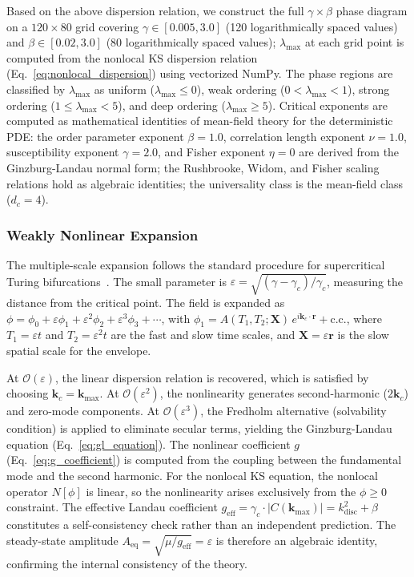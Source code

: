 \documentclass[sn-nature,pdflatex]{sn-jnl}
\begin{document}
Based on the above dispersion relation, we construct the full $\gamma\times\beta$ phase diagram on a $120 \times 80$ grid covering $\gamma \in [0.005, 3.0]$ (120 logarithmically spaced values) and $\beta \in [0.02, 3.0]$ (80 logarithmically spaced values); $\lambda_{\max}$ at each grid point is computed from the nonlocal KS dispersion relation (Eq.~\ref{eq:nonlocal_dispersion}) using vectorized NumPy. The phase regions are classified by $\lambda_{\max}$ as uniform ($\lambda_{\max} \le 0$), weak ordering ($0 < \lambda_{\max} < 1$), strong ordering ($1 \le \lambda_{\max} < 5$), and deep ordering ($\lambda_{\max} \ge 5$). Critical exponents are computed as mathematical identities of mean-field theory for the deterministic PDE: the order parameter exponent $\beta = 1.0$, correlation length exponent $\nu = 1.0$, susceptibility exponent $\gamma = 2.0$, and Fisher exponent $\eta = 0$ are derived from the Ginzburg-Landau normal form; the Rushbrooke, Widom, and Fisher scaling relations hold as algebraic identities; the universality class is the mean-field class ($d_c = 4$).

\subsubsection{Weakly Nonlinear Expansion}

The multiple-scale expansion follows the standard procedure for supercritical Turing bifurcations~\cite{aranson_kramer_2002}. The small parameter is $\varepsilon = \sqrt{(\gamma - \gamma_c)/\gamma_c}$, measuring the distance from the critical point. The field is expanded as $\phi = \phi_0 + \varepsilon\phi_1 + \varepsilon^2\phi_2 + \varepsilon^3\phi_3 + \cdots$, with $\phi_1 = A(T_1, T_2; \mathbf{X})\,e^{i\mathbf{k}_c\cdot\mathbf{r}} + \text{c.c.}$, where $T_1 = \varepsilon t$ and $T_2 = \varepsilon^2 t$ are the fast and slow time scales, and $\mathbf{X} = \varepsilon\mathbf{r}$ is the slow spatial scale for the envelope.

At $\mathcal{O}(\varepsilon)$, the linear dispersion relation is recovered, which is satisfied by choosing $\mathbf{k}_c = \mathbf{k}_{\max}$. At $\mathcal{O}(\varepsilon^2)$, the nonlinearity generates second-harmonic ($2\mathbf{k}_c$) and zero-mode components. At $\mathcal{O}(\varepsilon^3)$, the Fredholm alternative (solvability condition) is applied to eliminate secular terms, yielding the Ginzburg-Landau equation (Eq.~\ref{eq:gl_equation}). The nonlinear coefficient $g$ (Eq.~\ref{eq:g_coefficient}) is computed from the coupling between the fundamental mode and the second harmonic. For the nonlocal KS equation, the nonlocal operator $N[\phi]$ is linear, so the nonlinearity arises exclusively from the $\phi \ge 0$ constraint. The effective Landau coefficient $g_{\text{eff}} = \gamma_c \cdot |C(\mathbf{k}_{\max})| = k^2_{\text{disc}} + \beta$ constitutes a self-consistency check rather than an independent prediction. The steady-state amplitude $A_{\text{eq}} = \sqrt{\mu/g_{\text{eff}}} = \varepsilon$ is therefore an algebraic identity, confirming the internal consistency of the theory.
\end{document}
